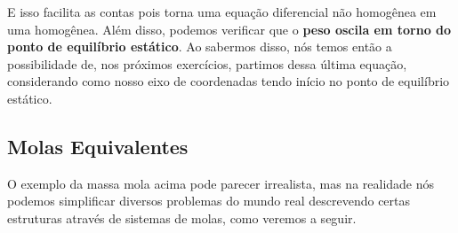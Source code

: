 \documentclass{article}
\begin{document}
                    E isso facilita as contas pois torna uma equação diferencial não homogênea em uma homogênea. 
                    Além disso, podemos verificar que o \textbf{peso oscila em torno do ponto de equilíbrio estático}. Ao sabermos disso, nós temos então a possibilidade de, nos próximos exercícios,
                    partimos dessa última equação, considerando como nosso eixo de coordenadas tendo início no ponto de equilíbrio estático.

            \subsection{Molas Equivalentes}

                O exemplo da massa mola acima pode parecer irrealista, mas na realidade nós podemos simplificar diversos problemas do mundo real descrevendo certas estruturas através de sistemas de
                molas, como veremos a seguir.
\end{document}
